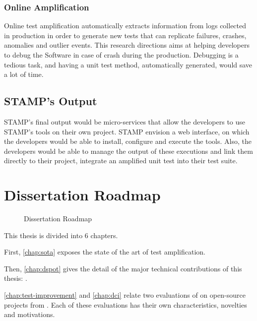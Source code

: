 \subsubsection{Online Amplification}
\label{subsubsec:intro:research-directions:online-ampl}

Online test amplification automatically extracts information from logs collected in production in order to generate new tests that can replicate failures, crashes, anomalies and outlier events.
This research directions aims at helping developers to debug the Software in case of crash during the production.
Debugging is a tedious task, and having a unit test method, automatically generated, would save a lot of time.

\subsection{STAMP's Output}

STAMP's final output would be micro-services that allow the developers to use STAMP's tools on their own project.
STAMP envision a web interface, on which the developers would be able to install, configure and execute the tools.
Also, the developers would be able to manage the output of these executions and link them directly to their project, \eg integrate an amplified unit test into their test suite.

\section{Dissertation Roadmap}
\label{sec:intro:roadmap}

\begin{figure}[h]
	\centering
	\caption{Dissertation Roadmap}
	\label{fig:intro:roadmap}
\end{figure}

This thesis is divided into 6 chapters.

First, \autoref{chap:sota} exposes the state of the art of test amplification.

Then, \autoref{chap:dspot} gives the detail of the major technical contributions of this thesis: \dspot.

\autoref{chap:test-improvement} and \autoref{chap:dci} relate two evaluations of \dspot on open-source projects from \gh.
Each of these evaluations has their own characteristics, novelties and motivations.

